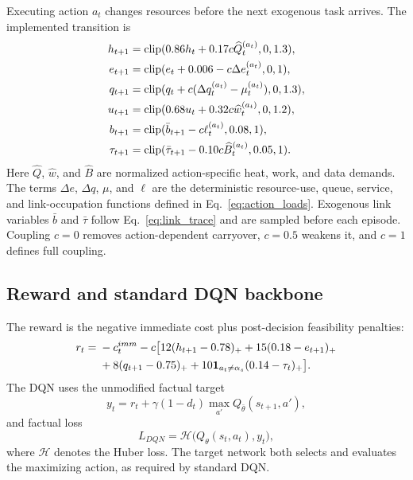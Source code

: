 \documentclass[11pt]{article}
\DeclareMathOperator{\clip}{clip}
\begin{document}
Executing action $a_t$ changes resources before the next exogenous task arrives. The implemented transition is
\begin{align}
h_{t+1}&=\clip(0.86h_t+0.17c\widehat Q_t^{(a_t)},0,1.3),\notag\\
e_{t+1}&=\clip(e_t+0.006-c\Delta e_t^{(a_t)},0,1),\notag\\
q_{t+1}&=\clip(q_t+c(\Delta q_t^{(a_t)}-\mu_t^{(a_t)}),0,1.3),\notag\\
u_{t+1}&=\clip(0.68u_t+0.32c\widehat w_t^{(a_t)},0,1.2),\notag\\
b_{t+1}&=\clip(\bar b_{t+1}-c\ell_t^{(a_t)},0.08,1),\notag\\
\tau_{t+1}&=\clip(\bar\tau_{t+1}-0.10c\widehat B_t^{(a_t)},0.05,1).
\label{eq:transition}
\end{align}
{\color{red}%
Here $\widehat Q$, $\widehat w$, and $\widehat B$ are normalized action-specific heat, work, and data demands. The terms $\Delta e$, $\Delta q$, $\mu$, and $\ell$ are the deterministic resource-use, queue, service, and link-occupation functions defined in Eq.~\eqref{eq:action_loads}. Exogenous link variables $\bar b$ and $\bar\tau$ follow Eq.~\eqref{eq:link_trace} and are sampled before each episode. Coupling $c=0$ removes action-dependent carryover, $c=0.5$ weakens it, and $c=1$ defines full coupling.
}%

\subsection{Reward and standard DQN backbone}

The reward is the negative immediate cost plus post-decision feasibility penalties:
\begin{align}
r_t={}&-c_t^{imm}-c\big[12(h_{t+1}-0.78)_+ +15(0.18-e_{t+1})_+\notag\\
&+8(q_{t+1}-0.75)_+ +10\mathbf 1_{a_t\ne\alpha_s}(0.14-\tau_t)_+\big].
\label{eq:reward}
\end{align}
The DQN uses the unmodified factual target
\begin{equation}
y_t=r_t+\gamma(1-d_t)\max_{a'}Q_{\bar\theta}(s_{t+1},a'),
\label{eq:factual}
\end{equation}
and factual loss
\begin{equation}
L_{DQN}=\mathcal H\big(Q_\theta(s_t,a_t),y_t\big),
\end{equation}
where $\mathcal H$ denotes the Huber loss. The target network both selects and evaluates the maximizing action, as required by standard DQN.
\end{document}
